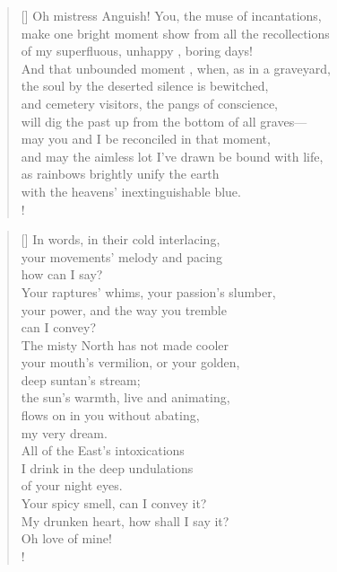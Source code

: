 \documentclass[]{article}
\begin{document}
\settowidth{\versewidth}{Oh mistress Anguish! You, the muse of incantations,} 
\begin{verse}[\versewidth]
Oh mistress Anguish! You, the muse of incantations,\\
make one bright moment show from all the recollections\\
of my superfluous, unhappy , boring days!\\
And that unbounded moment , when, as in a graveyard,\\
the soul by the deserted silence is bewitched,\\
and cemetery visitors, the pangs of conscience,\\
will dig the past up from the bottom of all graves—\\
may you and I be reconciled in that moment,\\
and may the aimless lot I've drawn be bound with life,\\
as rainbows brightly unify the earth\\
with the heavens' inextinguishable blue.\\!
\end{verse}
\bigskip

\settowidth{\versewidth}{In words, in their cold interlacing,}
\begin{verse}[\versewidth]
In words, in their cold interlacing,\\
your movements' melody and pacing\\
how can I say?\\
Your raptures' whims, your passion's slumber,\\
your power, and the way you tremble\\
can I convey?\\
The misty North has not made cooler\\
your mouth's vermilion, or your golden,\\
deep suntan's stream;\\
the sun's warmth, live and animating,\\
flows on in you without abating,\\
my very dream.\\
All of the East's intoxications\\
I drink in the deep undulations\\
of your night eyes.\\
Your spicy smell, can I convey it?\\
My drunken heart, how shall I say it?\\
Oh love of mine! \\!
\end{verse}
\newpage 
\end{document}
